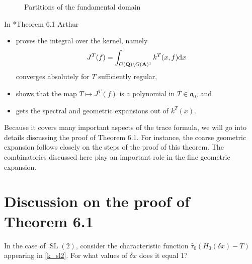 \documentclass[11pt]{amsart}
\def\A{\mathbf A}
\def\Q{\mathbf Q}
\def\aaa{\mathfrak a}
\def\cb#1{{\color{black}#1}}
\def\d{\text d}
\def\bs{\setminus} 			%
\def\sl{\operatorname{SL}}
\theoremstyle{remark}
\begin{document}
\begin{figure}
\centering
\caption{Partitions of the fundamental domain} \label{fig:fd}
\end{figure}

In \cite{clay}*{Theorem 6.1} Arthur 
\begin{itemize}
	\item proves the integral over the kernel, namely
			\[ J^T(f) = \int_{G(\Q) \bs G(\A)^1} k^T(x, f) \d x \]
			converges absolutely for $T$ sufficiently regular,
	\item shows that the map $T \mapsto J^T(f)$ is a polynomial in $T \in \aaa_0$, and
	\item gets the spectral and geometric expansions out of $k^T(x)$. 
\end{itemize}
Because it covers many important aspects of the trace formula, we will go into details discussing the proof of Theorem 6.1. For instance, the coarse geometric expansion follows closely on the steps of the proof of this theorem. The combinatorics discussed here play an important role in the fine geometric expansion. 

\section{Discussion on the proof of Theorem 6.1}

\cb{In the case of $\sl(2)$, consider the characteristic function $\hat\tau_0(H_0(\delta x) - T)$ appearing in \cref{k_sl2}. For what values of $\delta x$ does it equal 1? }
\end{document}
